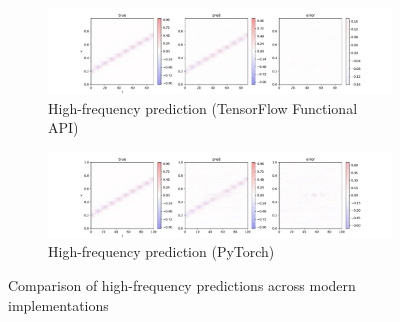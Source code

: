 \documentclass[10pt,journal,compsoc,onecolumn]{IEEEtran}
\begin{document}
\begin{figure}[htbp]
    \centering
    \begin{subfigure}[b]{0.3\textwidth}
        \includegraphics[width=\textwidth]{../../results/functional/high-frequency-adabelief-20250206-1520-1/vis}
        \caption{High-frequency prediction (TensorFlow Functional API)}
        \label{fig:high_freq_functional}
    \end{subfigure}
    \begin{subfigure}[b]{0.3\textwidth}
        \includegraphics[width=\textwidth]{../../results/pytorch/high-frequency-adabelief-20250206-1607-1/vis}
        \caption{High-frequency prediction (PyTorch)}
        \label{fig:high_freq_pytorch}
    \end{subfigure}
    \caption{Comparison of high-frequency predictions across modern implementations}
    \label{fig:high_freq_comparison}
\end{figure}
\end{document}
